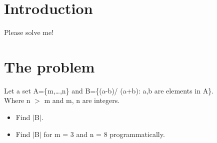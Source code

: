 \documentclass{article}
\begin{document}
\section{Introduction}
Please solve me!
\section{The problem}
Let a set A=\{m,\ldots,n\} and B=\{(a-b)/ (a+b): a,b are elements in A\}. \\
Where n $>$ m and m, n are integers.
\begin{itemize}
    \item Find $|$B$|$.
    \item Find $|$B$|$ for m = 3 and n = 8 programmatically.
\end{itemize}
\end{document}
